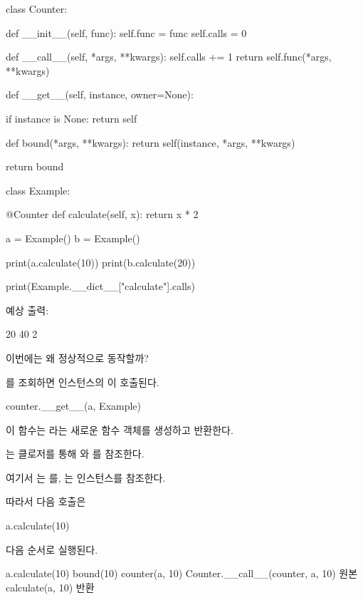 \begin{dhkcode}
class Counter:

    def __init__(self, func):
        self.func = func
        self.calls = 0

    def __call__(self, *args, **kwargs):
        self.calls += 1
        return self.func(*args, **kwargs)

    def __get__(self, instance, owner=None):

        if instance is None:
            return self

        def bound(*args, **kwargs):
            return self(instance, *args, **kwargs)

        return bound


class Example:

    @Counter
    def calculate(self, x):
        return x * 2


a = Example()
b = Example()

print(a.calculate(10))
print(b.calculate(20))

print(Example.__dict__["calculate"].calls)
\end{dhkcode}

예상 출력:

\begin{dhkzsh}
20
40
2
\end{dhkzsh}

이번에는 왜 정상적으로 동작할까?

를 조회하면  인스턴스의 이 호출된다.

\begin{dhkcode}
counter.__get__(a, Example)
\end{dhkcode}

이 함수는 라는 새로운 함수 객체를 생성하고 반환한다.

는 클로저를 통해 와 를 참조한다.

여기서 는 를, 는  인스턴스를 참조한다.

따라서 다음 호출은

\begin{dhkcode}
a.calculate(10)
\end{dhkcode}

다음 순서로 실행된다.

\begin{dhksmry}[centered]
a.calculate(10)
\da
bound(10)
\da
counter(a, 10)
\da
Counter.__call__(counter, a, 10)
\da
원본 calculate(a, 10)
 반환
\end{dhksmry}

